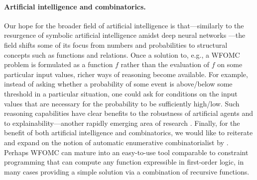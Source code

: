 \paragraph*{Artificial intelligence and combinatorics.}
Our hope for the broader field of artificial intelligence is that---similarly to the resurgence of symbolic artificial intelligence amidst deep neural networks \citep{garnelo2019reconciling}---the field shifts some of its focus from numbers and probabilities to structural concepts such as functions and relations. Once a solution to, e.g., a WFOMC problem is formulated as a function $f$ rather than the evaluation of $f$ on some particular input values, richer ways of reasoning become available. For example, instead of asking whether a probability of some event is above/below some threshold in a particular situation, one could ask for conditions on the input values that are necessary for the probability to be sufficiently high/low. Such reasoning capabilities have clear benefits to the robustness of artificial agents and to explainability---another rapidly emerging area of research \citep{DBLP:journals/corr/abs-1909-03012,DBLP:journals/fdata/BelleP21,DBLP:journals/corr/abs-2202-10335}. Finally, for the benefit of both artificial intelligence and combinatorics, we would like to reiterate and expand on the notion of automatic enumerative combinatorialist by \citet{DBLP:conf/ilp/BarvinekB0ZK21}. Perhaps WFOMC can mature into an easy-to-use tool comparable to constraint programming that can compute any function expressible in first-order logic, in many cases providing a simple solution via a combination of recursive functions.


